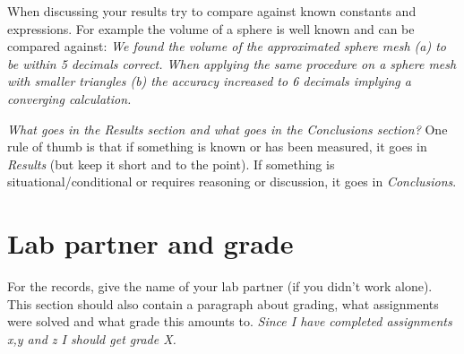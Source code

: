 \documentclass[onecolumn]{article}
\begin{document}
When discussing your results try to compare against known constants and expressions. For example the volume of a sphere is well known and can be compared against: \emph{We found the volume of the approximated sphere mesh (a) to be within 5 decimals correct. When applying the same procedure on a sphere mesh with smaller triangles (b) the accuracy increased to 6 decimals implying a converging calculation.}

\emph{What goes in the Results section and what goes in the Conclusions section?} One rule of thumb is that if something is known or has been measured, it goes in \emph{Results} (but keep it short and to the point). If something is situational/conditional or requires reasoning or discussion, it goes in \emph{Conclusions}.


\section{Lab partner and grade}
For the records, give the name of your lab partner (if you didn't work alone). This section should also contain a paragraph about grading, what assignments were solved and what grade this amounts to. \emph{Since I have completed assignments x,y and z I should get grade X.}

\nocite{*} %
\printbibliography{}
\end{document}
